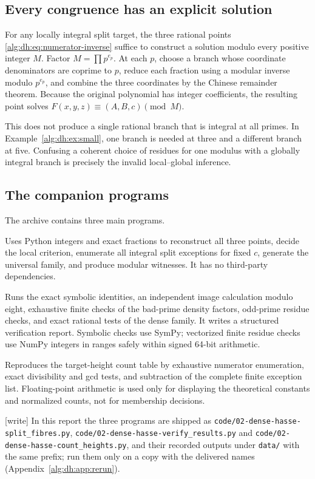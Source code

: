 \documentclass[11pt]{article}
\numberwithin{equation}{section}
\theoremstyle{plain}
\theoremstyle{plain}
\theoremstyle{plain}
\theoremstyle{definition}
\theoremstyle{definition}
\theoremstyle{definition}
\theoremstyle{remark}
\newcommand{\wtag}{\textup{[write]}}%
\newcommand{\rpath}[1]{\nolinkurl{#1}}
\begin{document}
\subsection{Every congruence has an explicit solution}
For any locally integral split target, the three rational points
\eqref{alg:dh:eq:numerator-inverse} suffice to construct a solution modulo every
positive integer $M$. Factor $M=\prod p^{e_p}$. At each $p$, choose a
branch whose coordinate denominators are coprime to $p$, reduce each
fraction using a modular inverse modulo $p^{e_p}$, and combine the
three coordinates by the Chinese remainder theorem.
Because the original polynomial has integer coefficients, the resulting
point solves $F(x,y,z)\equiv(A,B,c)\pmod M$.

This does not produce a single rational branch that is integral at all
primes. In Example~\ref{alg:dh:ex:small}, one branch is needed at three and a
different branch at five. Confusing a coherent choice of residues for
one modulus with a globally integral branch is precisely the invalid
local--global inference.

\subsection{The companion programs}
The archive contains three main programs.
\begin{description}[style=nextline,leftmargin=1.2em,labelindent=0pt]
\item[\rpath{code/split_fibres.py}]
Uses Python integers and exact fractions to reconstruct all three points,
decide the local criterion, enumerate all integral split exceptions for
fixed $c$, generate the universal family, and produce modular witnesses.
It has no third-party dependencies.
\item[\rpath{code/verify_results.py}]
Runs the exact symbolic identities, an independent image calculation
modulo eight, exhaustive finite checks of the bad-prime density factors,
odd-prime residue checks, and exact rational tests of the dense family.
It writes a structured verification report. Symbolic checks use SymPy;
vectorized finite residue checks use NumPy integers in ranges safely
within signed 64-bit arithmetic.
\item[\rpath{code/count_heights.py}]
Reproduces the target-height count table by exhaustive numerator
enumeration, exact divisibility and gcd tests, and subtraction of the
complete finite exception list. Floating-point arithmetic is used only
for displaying the theoretical constants and normalized counts, not
for membership decisions.
\end{description}
\wtag{} In this report the three programs are shipped as
\rpath{code/02-dense-hasse-split_fibres.py},
\rpath{code/02-dense-hasse-verify_results.py} and
\rpath{code/02-dense-hasse-count_heights.py}, and their recorded outputs
under \rpath{data/} with the same prefix; run them only on a copy with the
delivered names (Appendix~\ref{alg:dh:app:rerun}).
\end{document}
